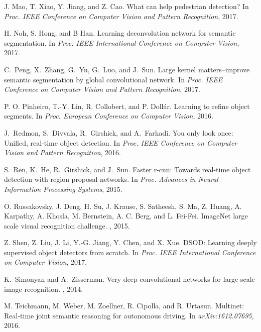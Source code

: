 \documentclass[10pt,twocolumn,letterpaper]{article}
\begin{document}
\begin{thebibliography}{10}
J. Mao, T. Xiao, Y. Jiang, and Z. Cao.
What can help pedestrian detection?
\newblock In {\em Proc. IEEE Conference on Computer Vision and Pattern Recognition},  2017.

H. Noh, S. Hong, and B Han.
Learning deconvolution network for semantic segmentation.
\newblock In {\em Proc. IEEE International Conference on Computer Vision}, 2017.

C.~Peng, X.~Zhang, G.~Yu, G.~Luo, and J.~Sun.
\newblock Large kernel matters--improve semantic segmentation by global convolutional network.
\newblock In {\em Proc. IEEE Conference on Computer Vision and Pattern Recognition},  2017.

P. O. Pinheiro, T.-Y. Lin, R. Collobert, and P. Doll{\'a}r.
\newblock Learning to refine object segments.
\newblock In {\em Proc. European Conference on Computer Vision}, 2016.

J.~Redmon, S.~Divvala, R.~Girshick, and A.~Farhadi.
\newblock You only look once: Unified, real-time object detection.
\newblock In {\em Proc. IEEE Conference on Computer Vision and Pattern Recognition}, 2016.

S.~Ren, K.~He, R.~Girshick, and J.~Sun.
\newblock Faster r-cnn: Towards real-time object detection with region proposal networks.
\newblock In {\em Proc. Advances in Neural Information Processing Systems}, 2015.
  
O. Russakovsky, J. Deng, H. Su, J. Krause, S. Satheesh, S. Ma, Z. Huang, A. Karpathy, A. Khosla, M. Bernstein, A. C. Berg, and L. Fei-Fei.
ImageNet large scale visual recognition challenge.
, 2015.

Z. Shen, Z. Liu, J. Li, Y.-G. Jiang, Y. Chen, and X. Xue.
DSOD: Learning deeply supervised object detectors from scratch.
\newblock In {\em Proc. IEEE International Conference on Computer Vision}, 2017.

K.~Simonyan and A.~Zisserman.
\newblock Very deep convolutional networks for large-scale image recognition.
, 2014.

M. Teichmann, M. Weber, M. Zoellner, R. Cipolla, and R. Urtasun. 
\newblock Multinet: Real-time joint semantic reasoning
for autonomous driving. \newblock In {\em arXiv:1612.07695}, 2016.


\end{thebibliography}
\end{document}
